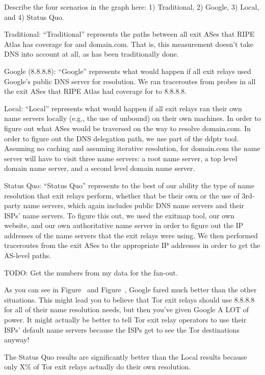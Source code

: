 Describe the four scenarios in the graph here: 1) Traditional, 2) Google, 3) Local, and 
4) Status Quo.

Traditional: ``Traditional'' represents the paths between all exit ASes that RIPE Atlas 
has coverage for and domain.com. That is, this measurement doesn't take DNS into account 
at all, as has been traditionally done.

Google (8.8.8.8): ``Google'' represents what would happen if all exit relays used 
Google's public DNS server for resolution. We ran traceroutes from probes in all the exit 
ASes that RIPE Atlas had coverage for to 8.8.8.8.

Local: ``Local'' represents what would happen if all exit relays ran their own name 
servers locally (e.g., the use of unbound) on their own machines. In order to figure out 
what ASes would be traversed on the way to resolve domain.com. In order to figure out the 
DNS delegation path, we use part of the ddptr tool. Assuming no caching and assuming 
iterative resolution, for domain.com the name server will have to visit three name servers:
a root name server, a top level domain name server, and a second level domain name server. 

Status Quo: ``Status Quo'' represents to the best of our ability the type of name resolution 
that exit relays perform, whether that be their own or the use of 3rd-party name servers, 
which again includes public DNS name servers and their ISPs' name servers. To figure this 
out, we used the exitmap tool, our own website, and our own authoritative name server 
in order to figure out the IP addresses of the name servers that the exit relays were 
using. We then performed traceroutes from the exit ASes to the appropriate IP addresses 
in order to get the AS-level paths.

TODO: Get the numbers from my data for the fan-out.

As you can see in Figure~ and
Figure~, 
Google fared much better than the other situations. This might lead you to believe that 
Tor exit relays should use 8.8.8.8 for all of their name resolution needs, but then you've 
given Google A LOT of power. It might actually be better to tell Tor exit relay operators 
to use their ISPs' default name servers because the ISPs get to see the Tor destinations 
anyway!

The Status Quo results are significantly better than the Local results because only X\% 
of Tor exit relays actually do their own resolution.


